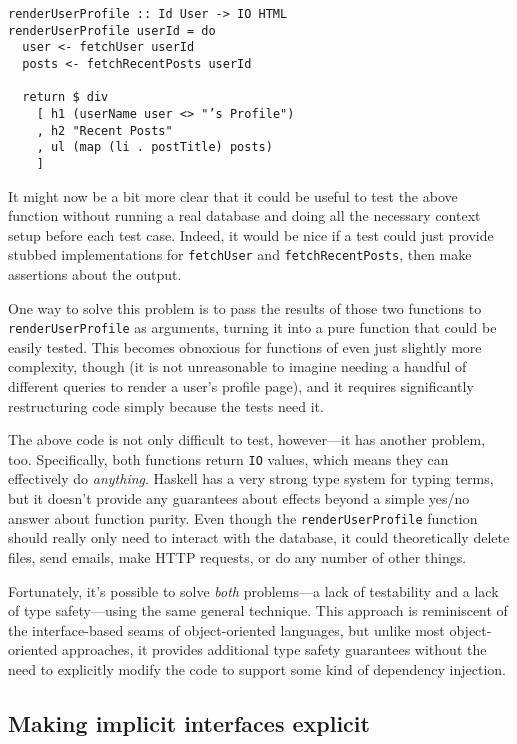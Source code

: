 \begin{verbatim}
renderUserProfile :: Id User -> IO HTML
renderUserProfile userId = do
  user <- fetchUser userId
  posts <- fetchRecentPosts userId

  return $ div
    [ h1 (userName user <> "’s Profile")
    , h2 "Recent Posts"
    , ul (map (li . postTitle) posts)
    ]
\end{verbatim}
It might now be a bit more clear that it could be useful to test the
above function without running a real database and doing all the
necessary context setup before each test case. Indeed, it would be nice
if a test could just provide stubbed implementations for
\texttt{fetchUser} and \texttt{fetchRecentPosts}, then make assertions
about the output.

One way to solve this problem is to pass the results of those two
functions to \texttt{renderUserProfile} as arguments, turning it into a
pure function that could be easily tested. This becomes obnoxious for
functions of even just slightly more complexity, though (it is not
unreasonable to imagine needing a handful of different queries to render
a user's profile page), and it requires significantly restructuring code
simply because the tests need it.

The above code is not only difficult to test, however---it has another
problem, too. Specifically, both functions return \texttt{IO} values,
which means they can effectively do \emph{anything}. Haskell has a very
strong type system for typing terms, but it doesn't provide any
guarantees about effects beyond a simple yes/no answer about function
purity. Even though the \texttt{renderUserProfile} function should
really only need to interact with the database, it could theoretically
delete files, send emails, make HTTP requests, or do any number of other
things.

Fortunately, it's possible to solve \emph{both} problems---a lack of
testability and a lack of type safety---using the same general
technique. This approach is reminiscent of the interface-based seams of
object-oriented languages, but unlike most object-oriented approaches,
it provides additional type safety guarantees without the need to
explicitly modify the code to support some kind of dependency injection.

\subsection{Making implicit interfaces
explicit}\label{making-implicit-interfaces-explicit}

